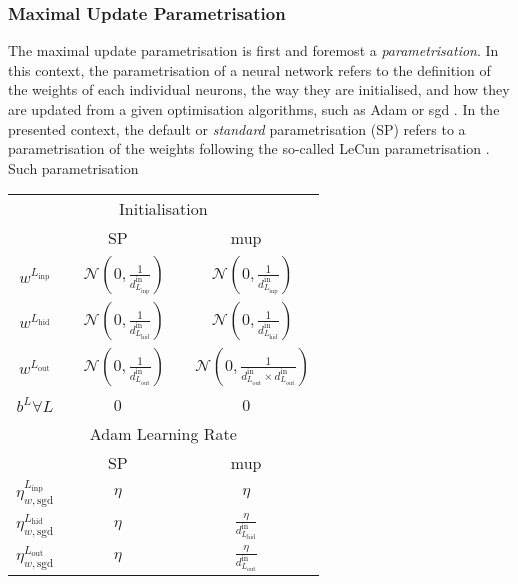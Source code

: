 \subsubsection{Maximal Update Parametrisation}
The maximal update parametrisation is first and foremost a \textit{parametrisation}. In this context, the parametrisation of a neural network refers to the definition of the weights of each individual neurons, the way they are initialised, and how they are updated from a given optimisation algorithms, such as Adam or \gls{sgd} \cite{adamPaper}. In the presented context, the default or \textit{standard} parametrisation (SP) refers to a parametrisation of the weights following the so-called LeCun parametrisation \Cite{LeCun2012}. Such parametrisation 

\begin{table}[h]
  \begin{center}
      \begin{tabular}{c|c|c} 
      	 \hline \hline
          \multicolumn{3}{c}{Initialisation} \\
            & SP  & \gls{mup}  \\ \hline
          $w^{L_\textrm{inp}}$ & ~ $\mathcal{N}\left(0, \frac{1}{d^{\textrm{in}}_{L_\textrm{inp}}}\right)$ & ~ $\mathcal{N}\left(0, \frac{1}{d^{\textrm{in}}_{L_\textrm{inp}}}\right)$                                         \\ 
          $w^{L_\textrm{hid}}$ & ~ $\mathcal{N}\left(0, \frac{1}{d^{\textrm{in}}_{L_\textrm{hid}}}\right)$ & ~ $\mathcal{N}\left(0, \frac{1}{d^{\textrm{in}}_{L_\textrm{hid}}}\right)$                                         \\ 
          $w^{L_\textrm{out}}$ & ~ $\mathcal{N}\left(0, \frac{1}{d^{\textrm{in}}_{L_\textrm{out}}}\right)$ & ~ $\mathcal{N}\left(0, \frac{1}{d^{\textrm{in}}_{L_\textrm{out}}\times d^{\textrm{in}}_{L_\textrm{out}}}\right)$  \\ 
          $b^{L} \forall L$ & 0 & 0  \\  \hline \hline
          \multicolumn{3}{c}{Adam Learning Rate} \\ 
          & SP  & \gls{mup}  \\ \hline
          $\eta_{w, \textrm{sgd}}^{L_\textrm{inp}}$  & $\eta$ & $\eta$                                          \\ 
          $\eta_{w, \textrm{sgd}}^{L_\textrm{hid}}$  & $\eta$ & $\frac{\eta}{d^{\textrm{in}}_{L_\textrm{hid}}}$ \\ 
          $\eta_{w, \textrm{sgd}}^{L_\textrm{out}}$  & $\eta$ & $\frac{\eta}{d^{\textrm{in}}_{L_\textrm{out}}}$ \\

\end{tabular}
\end{center}
\end{table}

